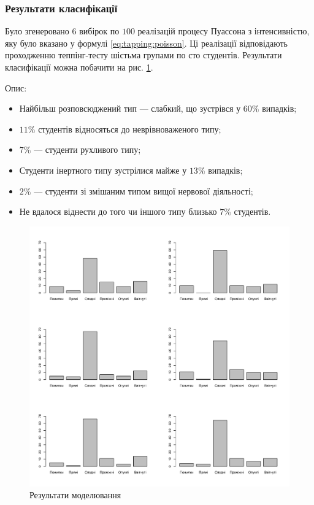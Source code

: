 \subsubsection{Результати класифікації}
Було згенеровано $6$ вибірок по $100$ реалізацій процесу Пуассона з
інтенсивністю, яку було вказано у формулі \eqref{eq:tapping:poisson}.
Ці реалізації відповідають проходженню теппінг-тесту шістьма групами по сто
студентів.
Результати класифікації можна побачити на рис. \ref{fig:tapping:poisson:types}.

Опис:
\begin{itemize}
  \item
    Найбільш розповсюджений тип --- слабкий, що зустрівся у $60\%$
    випадків;
  \item
    $11\%$ студентів відносяться до неврівноваженого типу;
  \item
    $7\%$ --- студенти рухливого типу;
  \item
    Студенти інертного типу зустрілися майже у $13\%$ випадків;
  \item
    $2\%$ --- студенти зі змішаним типом вищої нервової діяльності;
  \item
    Не вдалося віднести до того чи іншого типу близько $7\%$ студентів.
\end{itemize}

\begin{figure}[h]
  \centering
  \includegraphics[width=\textwidth]{images/poisson_types}
  \caption{Результати моделювання}
  \label{fig:tapping:poisson:types}
\end{figure}
